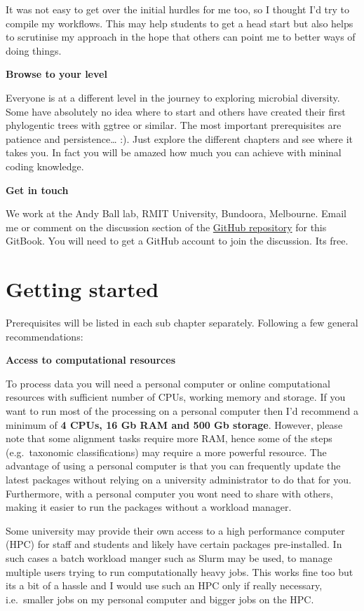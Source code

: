 \documentclass[
]{book}
\begin{document}
It was not easy to get over the initial hurdles for me too, so I thought I'd try to compile my workflows. This may help students to get a head start but also helps to scrutinise my approach in the hope that others can point me to better ways of doing things.

\textbf{Browse to your level}

Everyone is at a different level in the journey to exploring microbial diversity. Some have absolutely no idea where to start and others have created their first phylogentic trees with ggtree or similar. The most important prerequisites are patience and persistence\ldots{} :). Just explore the different chapters and see where it takes you. In fact you will be amazed how much you can achieve with mininal coding knowledge.

\textbf{Get in touch}

We work at the Andy Ball lab, RMIT University, Bundoora, Melbourne. Email me or comment on the discussion section of the \href{https://github.com/chrismitbiz/ABlab-workflows/discussions/}{GitHub repository} for this GitBook. You will need to get a GitHub account to join the discussion. Its free.

\hypertarget{getting-started}{%
\chapter{Getting started}\label{getting-started}}

Prerequisites will be listed in each sub chapter separately.
Following a few general recommendations:

\textbf{Access to computational resources}

To process data you will need a personal computer or online computational resources with sufficient number of CPUs, working memory and storage. If you want to run most of the processing on a personal computer then I'd recommend a minimum of \textbf{4 CPUs, 16 Gb RAM and 500 Gb storage}. However, please note that some alignment tasks require more RAM, hence some of the steps (e.g.~taxonomic classifications) may require a more powerful resource. The advantage of using a personal computer is that you can frequently update the latest packages without relying on a university administrator to do that for you. Furthermore, with a personal computer you wont need to share with others, making it easier to run the packages without a workload manager.

Some university may provide their own access to a high performance computer (HPC) for staff and students and likely have certain packages pre-installed. In such cases a batch workload manger such as Slurm may be used, to manage multiple users trying to run computationally heavy jobs. This works fine too but its a bit of a hassle and I would use such an HPC only if really necessary, i.e.~smaller jobs on my personal computer and bigger jobs on the HPC.
\end{document}
